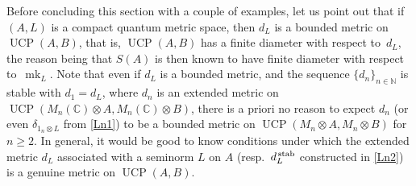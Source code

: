 \documentclass[11pt, a4paper, oneside, final, reqno]{amsart}
\newcommand{\bbN}{\mathbb{N}}
\newcommand{\bbC}{\mathbb{C}}
\newcommand{\UCP}{\operatorname{UCP}}
\newcommand{\mk}{\operatorname{mk}}
\theoremstyle{definition}
\theoremstyle{plain}
\theoremstyle{remark}
\numberwithin{equation}{section}
\begin{document}
Before concluding this section with a couple of examples, let us point out that if $(A, L)$ is a compact quantum metric space, then $d_L$ is a bounded metric on $\UCP(A, B)$, that is,  $\UCP(A,B)$ has a finite diameter with respect to~$d_L$, the reason being that $S(A)$ is then known to have finite diameter with respect to~$\mk_L$. Note that even if $d_L$ is a bounded metric, and the sequence $\{d_n\}_{n \in \bbN}$ is stable with $d_1=d_L$, where $d_n$ is an extended metric on $\UCP(M_n(\bbC) \otimes A, M_n(\bbC) \otimes B)$, there is a priori no reason to expect $d_n$ (or even $\delta_{1_n \otimes L}$ from \cref{Ln1}) to be a bounded metric on $\UCP(M_n \otimes A, M_n \otimes B)$ for $n\geq 2$. In general, it would be good to know conditions under which the extended metric $d_L$ associated with a seminorm $L$ on $A$ (resp.~$d_L^{\, \rm stab}$ constructed in \cref{Ln2}) is a genuine metric on $\UCP(A, B)$.
\end{document}
